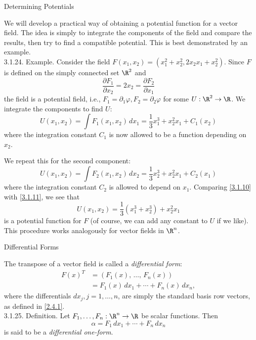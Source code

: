 \documentclass[smaller,hyperref={CJKbookmarks=true}]{beamer}
\begin{document}
\begin{frame}{Determining Potentials}
\begin{spacing}{0.9}
We will develop a practical way of obtaining a potential function for a
vector field. The idea is simply to integrate the components of the field
and compare the results, then try to find a compatible potential. This is
best demonstrated by an example.\\[4pt]
\alert{3.1.24. Example.} Consider the field $F(x_1,x_2)=(x_1^2+x_2^2,2x_2x_1+x_2^2)$. Since $F$ is defined on the simply connected set $\R^2$ and
\[\frac{\partial F_1}{\partial x_2}=2x_2=\frac{\partial F_2}{\partial x_1}\]
the field is a potential field, i.e., $F_1=\partial_1\varphi,F_2=\partial_2\varphi$ for some $U:\R^2\to\R$. We integrate the components to find $U$:
\begin{equation}\label{3.1.10}
U(x_1,x_2)=\int F_1(x_1,x_2)\,dx_1=
\frac{1}{3}x_1^3+x_2^2x_1+C_1(x_2)
\end{equation}
where the integration constant $C_1$ is now allowed to be a function depending on $x_2$.
\end{spacing}
\newpage
\begin{spacing}{1}
\vspace*{13pt}
We repeat this for the second component:
\begin{equation}\label{3.1.11}
  U(x_1,x_2)=\int F_2(x_1,x_2)\,dx_2
  =\frac{1}{3}x_2^3+x_2^2x_1+C_2(x_1)
\end{equation}
where the integration constant $C_2$ is allowed to depend on $x_1$. Comparing \eqref{3.1.10} with \eqref{3.1.11}, we see that
\[U(x_1,x_2)=\frac{1}{3}(x_1^3+x_2^3)+x_2^2x_1\]
is a potential function for $F$ (of course, we can add any constant to $U$ if we like).\\[5pt]
This procedure works analogously for vector fields in $\R^n$.
\end{spacing}
\end{frame}
\begin{frame}[c]{Dif{}ferential Forms}
\begin{spacing}{1.1}
The transpose of a vector field is called a \emph{dif{}ferential form}:
\begin{equation*}
  \begin{split}
     F(x)^T &=\left(F_1(x),\,\ldots,\,F_n(x)\right) \\
       &=F_1(x)\,dx_1+\cdots+F_n(x)\,dx_n,
  \end{split}
\end{equation*}
where the dif{}ferentials $dx_j,j=1,\ldots,n$, are simply the standard basis row vectors, as defined in \eqref{2.4.1}.\\[4pt]
\alert{3.1.25. Definition.} Let $F_1,\ldots,F_n:\R^n\to\R$ be scalar functions. Then
\[\alpha=F_1\,dx_1+\cdots+F_n\,dx_n\]
is said to be a \emph{dif{}ferential one-form}.
\end{spacing}
\end{frame}
\end{document}
